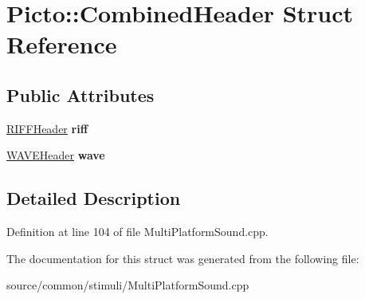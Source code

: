 \hypertarget{struct_picto_1_1_combined_header}{\section{Picto\-:\-:Combined\-Header Struct Reference}
\label{struct_picto_1_1_combined_header}
}
\subsection*{Public Attributes}
\begin{DoxyCompactItemize}
\item 
\hypertarget{struct_picto_1_1_combined_header_a73736ab98841a129bcc42303e3d68011}{\hyperlink{struct_picto_1_1_r_i_f_f_header}{R\-I\-F\-F\-Header} {\bfseries riff}}\label{struct_picto_1_1_combined_header_a73736ab98841a129bcc42303e3d68011}

\item 
\hypertarget{struct_picto_1_1_combined_header_a35d4dbe60a73e9694a39a2ccc2f6f304}{\hyperlink{struct_picto_1_1_w_a_v_e_header}{W\-A\-V\-E\-Header} {\bfseries wave}}\label{struct_picto_1_1_combined_header_a35d4dbe60a73e9694a39a2ccc2f6f304}

\end{DoxyCompactItemize}


\subsection{Detailed Description}


Definition at line 104 of file Multi\-Platform\-Sound.\-cpp.



The documentation for this struct was generated from the following file\-:\begin{DoxyCompactItemize}
\item 
source/common/stimuli/Multi\-Platform\-Sound.\-cpp\end{DoxyCompactItemize}
